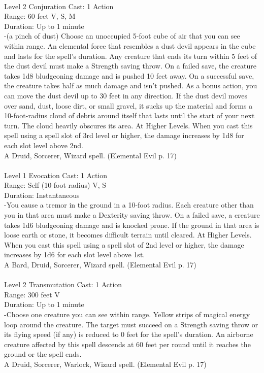 \documentclass[10pt,twocolumn]{report}
\begin{document}
 \\
Level 2 \quad Conjuration \quad Cast: 1 Action\\
Range: 60 feet \quad V, S, M\\
Duration: Up to 1 minute \quad \\
-(a pinch of dust)
Choose an unoccupied 5-foot cube of air that you can see within range. An elemental force that resembles a dust devil appears in the cube and lasts for the spell’s duration.
Any creature that ends its turn within 5 feet of the dust devil must make a Strength saving throw. On a failed save, the creature takes 1d8 bludgeoning damage and is pushed 10 feet away. On a successful save, the creature takes half as much damage and isn’t pushed.
As a bonus action, you can move the dust devil up to 30 feet in any direction. If the dust devil moves over sand, dust, loose dirt, or small gravel, it sucks up the material and forms a 10-foot-radius cloud of debris around itself that lasts until the start of your next turn. The cloud heavily obscures its area.
At Higher Levels. When you cast this spell using a spell slot of 3rd level or higher, the damage increases by 1d8 for each slot level above 2nd.\\
A Druid, Sorcerer, Wizard spell. (Elemental Evil p. 17) \\


 \\
Level 1 \quad Evocation \quad Cast: 1 Action\\
Range: Self (10-foot radius) \quad V, S\\
Duration: Instantaneous \quad \\
-You cause a tremor in the ground in a 10-foot radius. Each creature other than you in that area must make a Dexterity saving throw. On a failed save, a creature takes 1d6 bludgeoning damage and is knocked prone. If the ground in that area is loose earth or stone, it becomes difficult terrain until cleared. At Higher Levels. When you cast this spell using a spell slot of 2nd level or higher, the damage increases by 1d6 for each slot level above 1st.\\
A Bard, Druid, Sorcerer, Wizard spell. (Elemental Evil p. 17) \\


 \\
Level 2 \quad Transmutation \quad Cast: 1 Action\\
Range: 300 feet \quad V\\
Duration: Up to 1 minute \quad \\
-Choose one creature you can see within range. Yellow strips of magical energy loop around the creature. The target must succeed on a Strength saving throw or its flying speed (if any) is reduced to 0 feet for the spell’s duration. An airborne creature affected by this spell descends at 60 feet per round until it reaches the ground or the spell ends.\\
A Druid, Sorcerer, Warlock, Wizard spell. (Elemental Evil p. 17) \\
\end{document}
